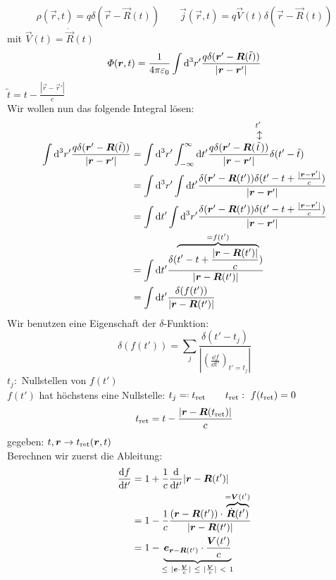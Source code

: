 %
%
%
%
%
%
\begin{equation*}
\rho(\vec{r},t) = q \delta (\vec{r} - \vec{R}(t)) \qquad \vec{j}(\vec{r},t) = q \vec{V}(t) \delta(\vec{r} - \vec{R}(t))
\end{equation*}
mit $ \vec{V}(t) = \dot{\vec{R}}(t) $\\
\begin{equation*}
\varPhi(\bm{r},t) = \frac{1}{4\pi\varepsilon_0} \int \textrm{d}^3 r' \frac{q \delta(\bm{r}' - \bm{R}(\tilde{t}))}{|\bm{r} - \bm{r}'|}
\end{equation*}
$ \tilde{t} = t - \frac{|\vec{r} - \vec{r}'|}{c} $\\
Wir wollen nun das folgende Integral lösen:
\begin{align*}
\int \dd^3 r' \frac{q \delta(\vec{r}' - \vec{R}(\tilde{t}))}{|\vec{r} - \vec{r}'|} &= \int \dd^3 r' \int_{-\infty}^{\infty} \dd t' \frac{q \delta(\vec{r}' - \vec{R}(\custoup{\leftrightarrow}{\tilde{t}}{t'}))}{|\vec{r} - \vec{r}'|} \delta(t' - \tilde{t})\\
&= \int \dd^3 r' \int \dd t' \frac{\delta(\vec{r}' - \vec{R}(t')) \delta(t' - t + \frac{|\vec{r} - \vec{r}'|}{c})}{|\vec{r} - \vec{r}'|}\\
&= \int \dd t' \int \dd^3 r' \frac{\delta(\vec{r}' - \vec{R}(t')) \delta(t' - t + \frac{|\vec{r} - \vec{r}'|}{c})}{|\vec{r} - \vec{r}'|}\\
&= \int \dd t' \frac{\delta(\ob{t' - t + \frac{|\vec{r} - \vec{R}(t')|}{c}}^{= f(t')})}{|\vec{r} - \vec{R}(t')|}\\
&= \int \dd t' \frac{\delta(f(t'))}{|\vec{r} - \vec{R}(t')|}
\end{align*}
Wir benutzen eine Eigenschaft der $ \delta $-Funktion:
\begin{equation*}
\delta (f(t')) = \sum_{j} \frac{\delta(t' - t_j)}{\left|\left(\frac{\dd f}{\dd t'}\right)_{t' = t_j}\right|}
\end{equation*}
$ t_j : $ Nullstellen von $ f(t') $\\
$ f(t') $ hat höchstens eine Nullstelle: $ t_j \eqdef t_{\tx{ret}} \qquad t_{\tx{ret}}: \ f(t_{\tx{ret}}) = 0$
\begin{equation*}
t_{\textrm{ret}} = t - \frac{|\bm{r} - \bm{R}(t_{\textrm{ret}}) |}{c}
\end{equation*}
gegeben: $ t , \bm{r} \rightarrow t_{\textrm{ret}}(\bm{r},t) $\\[5pt]
Berechnen wir zuerst die Ableitung:
\begin{align*}
\prd{f}{t'} &= 1 + \frac{1}{c} \prd{}{t'} |\vec{r} - \vec{R}(t')|\\
&= 1 - \frac{1}{c} \frac{(\vec{r} - \vec{R}(t')) \cdot \ob{\dot{\vec{R}}(t')}^{=\vec{V}(t')}}{|\vec{r} - \vec{R}(t')|}\\
&= 1 - \ub{\vec{e}_{\vec{r} - \vec{R}(t')} \cdot \frac{\vec{V}(t')}{c}}_{\le\ |\vec{e} \cdot \frac{\vec{V}}{c}| \ \le \ |\frac{\vec{V}}{c}| \ < \ 1}
\end{align*}
